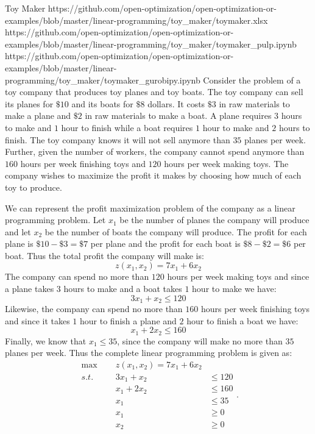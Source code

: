 \begin{examplewithallcode}{Toy Maker}
{https://github.com/open-optimization/open-optimization-or-examples/blob/master/linear-programming/toy_maker/toymaker.xlsx}
{https://github.com/open-optimization/open-optimization-or-examples/blob/master/linear-programming/toy_maker/toymaker_pulp.ipynb}
{https://github.com/open-optimization/open-optimization-or-examples/blob/master/linear-programming/toy_maker/toymaker_gurobipy.ipynb}
Consider the problem of a toy company that produces toy planes and toy boats. The toy company can sell its planes for $\$10$ and its boats for $\$8$ dollars. It costs $\$3$ in raw materials to make a plane and $\$2$ in raw materials to make a boat. A plane requires $3$ hours to make and $1$ hour to finish while a boat requires $1$ hour to make and $2$ hours to finish. The toy company knows it will not sell anymore than $35$ planes per week. Further, given the number of workers, the company cannot spend anymore than $160$ hours per week finishing toys and $120$ hours per week making toys. The company wishes to maximize the profit it makes by choosing how much of each toy to produce. 

We can represent the profit maximization problem of the company as a linear programming problem. Let $x_1$ be the number of planes the company will produce and let $x_2$ be the number of boats the company will produce. The profit for each plane is $\$10 - \$3 = \$7$ per plane and the profit for each boat is $\$8 - \$2 = \$6$ per boat. Thus the total profit the company will make is:
\begin{equation}
z(x_1,x_2) = 7x_1 + 6x_2
\end{equation}
The company can spend no more than $120$ hours per week making toys and since a plane takes $3$ hours to make and a boat takes $1$ hour to make we have:
\begin{equation}
3x_1 + x_2 \leq 120
\end{equation}
Likewise, the company can spend no more than $160$ hours per week finishing toys and since it takes $1$ hour to finish a plane and $2$ hour to finish a boat we have:
\begin{equation}
x_1 + 2x_2 \leq 160
\end{equation}
Finally, we know that $x_1 \leq 35$, since the company will make no more than $35$ planes per week. Thus the complete linear programming problem is given as:
\begin{equation}
\begin{aligned}
\max\;\;&& z(x_1,x_2) = 7x_1 + 6x_2\\
s.t.\;\;&&  3x_1 + x_2 &\leq 120\\
&& x_1 + 2x_2 &\leq 160\\
&& x_1 &\leq 35\\
&& x_1 &\geq 0\\
&& x_2 &\geq 0
\end{aligned}
.
\label{eqn:ToyMakerEx}
\end{equation}
\label{ex:ToyMaker}
\end{examplewithallcode}




